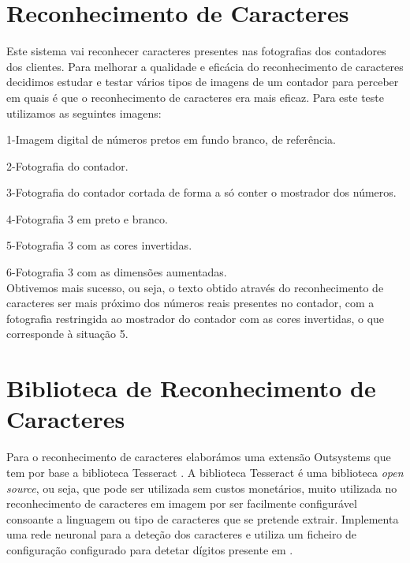 \section{Reconhecimento de Caracteres} \label{sec:caracteres}
Este sistema vai reconhecer caracteres presentes nas fotografias dos contadores dos clientes. Para melhorar a qualidade e eficácia do reconhecimento de caracteres decidimos estudar e testar vários tipos de imagens de um contador para perceber em quais é que o reconhecimento de caracteres era mais eficaz.
Para este teste utilizamos as seguintes imagens:\\
\par1-Imagem digital de números pretos em fundo branco, de referência.
\par2-Fotografia do contador.
\par3-Fotografia do contador cortada de forma a só conter o mostrador dos números.
\par4-Fotografia 3 em preto e branco.
\par5-Fotografia 3 com as cores invertidas.
\par6-Fotografia 3 com as dimensões aumentadas.\\

Obtivemos mais sucesso, ou seja, o texto obtido através do reconhecimento de caracteres ser mais próximo dos números reais presentes no contador, com a fotografia restringida ao mostrador do contador com as cores invertidas, o que corresponde à situação 5.

\section{Biblioteca de Reconhecimento de Caracteres} \label{bibc}
Para o reconhecimento de caracteres elaborámos uma extensão Outsystems que tem por base a biblioteca Tesseract \cite{tesseract}. A biblioteca Tesseract é uma biblioteca \textit{open source}, ou seja, que pode ser utilizada sem custos monetários, muito utilizada no reconhecimento de caracteres em imagem por ser facilmente configurável consoante a linguagem ou tipo de caracteres que se pretende extrair. Implementa uma rede neuronal para a deteção dos caracteres e utiliza um ficheiro de configuração configurado para detetar dígitos presente em \cite{digits}.

